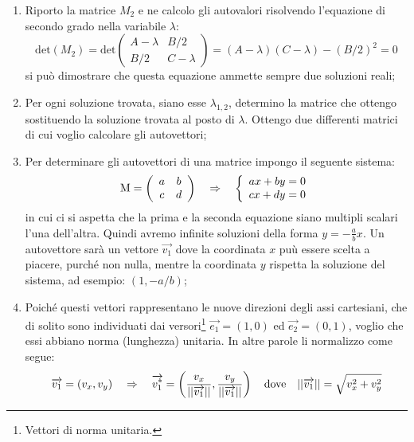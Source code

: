 \documentclass[a4paper, oneside]{article}
\begin{document}
		\begin{enumerate}
			\item Riporto la matrice $M_2$ e ne calcolo gli autovalori risolvendo l'equazione di secondo grado nella variabile $\lambda$:
			\begin{equation*}
				\mathrm{det}(M_2) = \mathrm{det}\left(
				\begin{array}{cc}
					A-\lambda & B/2 \\
					B/2 & C-\lambda
				\end{array} \right) = (A-\lambda)(C-\lambda)-(B/2)^2=0
			\end{equation*} si può dimostrare che questa equazione ammette sempre due soluzioni reali;
			\item Per ogni soluzione trovata, siano esse $\lambda_{1,2}$, determino la matrice che ottengo sostituendo la soluzione trovata al posto di $\lambda$. Ottengo due differenti matrici di cui voglio calcolare gli autovettori;
			\item Per determinare gli autovettori di una matrice impongo il seguente sistema:
			\begin{equation*}
				\mathrm{M}=\left(
				\begin{array}{cc}
					a & b \\
					c & d
				\end{array} \right) \quad \Rightarrow \quad
				\left\{
				\begin{array}{c}
					ax+by=0 \\
					cx+dy=0
				\end{array} \right.
			\end{equation*}
			in cui ci si aspetta che la prima e la seconda equazione siano multipli scalari l'una dell'altra. Quindi avremo infinite soluzioni della forma $y=-\frac{a}{b}x$. Un autovettore sarà un vettore $\overrightarrow{v_1}$ dove la coordinata $x$ puù essere scelta a piacere, purché non nulla, mentre la coordinata $y$ rispetta la soluzione del sistema, ad esempio: $(1, -a/b)$;
			\item Poiché questi vettori rappresentano le nuove direzioni degli assi cartesiani, che di solito sono individuati dai versori\footnote{Vettori di norma unitaria.} $\overrightarrow{e_1}=(1,0)$ ed $\overrightarrow{e_2}=(0,1)$, voglio che essi abbiano norma (lunghezza) unitaria. In altre parole li normalizzo come segue:
			\begin{equation*}
				\overrightarrow{v_1}=(v_x,v_y) \quad \allora \quad \overrightarrow{v_1^{*}}=\left( \frac{v_x}{||\overrightarrow{v_1}||}, \frac{v_y}{||\overrightarrow{v_1}||} \right) \quad \mathrm{dove} \quad ||\overrightarrow{v_1}||= \sqrt{v_x^2+v_y^2}

\end{equation*}
\end{enumerate}
\end{document}
